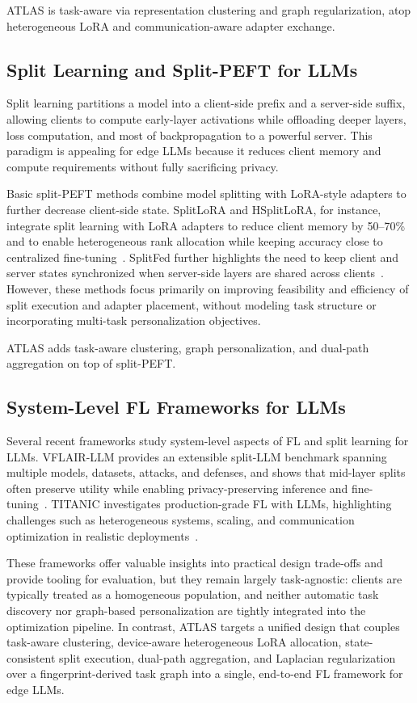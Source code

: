 \documentclass[conference]{IEEEtran}
\begin{document}
ATLAS is task-aware via representation clustering and graph regularization, atop heterogeneous LoRA and communication-aware adapter exchange.


\subsection{Split Learning and Split-PEFT for LLMs}

Split learning partitions a model into a client-side prefix and a server-side suffix, allowing clients to compute early-layer activations while offloading deeper layers, loss computation, and most of backpropagation to a powerful server. This paradigm is appealing for edge LLMs because it reduces client memory and compute requirements without fully sacrificing privacy.

Basic split-PEFT methods combine model splitting with LoRA-style adapters to further decrease client-side state. SplitLoRA and HSplitLoRA, for instance, integrate split learning with LoRA adapters to reduce client memory by 50--70\% and to enable heterogeneous rank allocation while keeping accuracy close to centralized fine-tuning~\cite{splitlora,hsplitlora}. SplitFed further highlights the need to keep client and server states synchronized when server-side layers are shared across clients~\cite{splitfed}. However, these methods focus primarily on improving feasibility and efficiency of split execution and adapter placement, without modeling task structure or incorporating multi-task personalization objectives.

ATLAS adds task-aware clustering, graph personalization, and dual-path aggregation on top of split-PEFT.


\subsection{System-Level FL Frameworks for LLMs}

Several recent frameworks study system-level aspects of FL and split learning for LLMs. VFLAIR-LLM provides an extensible split-LLM benchmark spanning multiple models, datasets, attacks, and defenses, and shows that mid-layer splits often preserve utility while enabling privacy-preserving inference and fine-tuning~\cite{vflair_llm}. TITANIC investigates production-grade FL with LLMs, highlighting challenges such as heterogeneous systems, scaling, and communication optimization in realistic deployments~\cite{titanic}.

These frameworks offer valuable insights into practical design trade-offs and provide tooling for evaluation, but they remain largely task-agnostic: clients are typically treated as a homogeneous population, and neither automatic task discovery nor graph-based personalization are tightly integrated into the optimization pipeline. In contrast, ATLAS targets a unified design that couples task-aware clustering, device-aware heterogeneous LoRA allocation, state-consistent split execution, dual-path aggregation, and Laplacian regularization over a fingerprint-derived task graph into a single, end-to-end FL framework for edge LLMs.
\end{document}
